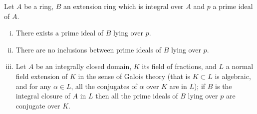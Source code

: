 \begin{theorem}\label{thm:9.3}
Let $A$ be a ring, $B$ an extension ring which is integral over
$A$ and $p$ a prime ideal of $A$.
\begin{enumerate}[(i)]
  \item There exists a prime ideal of $B$ lying over $p$.
  \item There are no inclusions between prime ideals of $B$ lying over $p$.
  \item Let $A$ be an integrally closed domain, $K$ its field of fractions, and $L$ a
        normal field extension of $K$ in the sense of Galois theory (that is $K \subset L$ is
        algebraic, and for any $\alpha \in L$, all the conjugates of $\alpha$ over $K$ are in $L$); if $B$ is the
        integral closure of $A$ in $L$ then all the prime ideals of $B$ lying over $p$
        are conjugate over $K$.
\end{enumerate}
\end{theorem}

